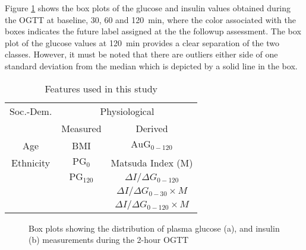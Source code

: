 \documentclass[a4paper,twoside]{article}
\begin{document}
Figure \ref{fig:ogtt_mean} shows the box plots of the glucose and insulin values obtained during the OGTT at baseline, 30, 60 and \SI{120}{\minute}, where the color associated with the boxes indicates the future label assigned at the the followup assessment. The box plot of the glucose values at \SI{120}{\minute} provides a clear separation of the two classes. However, it must be noted that there are outliers either side of one standard deviation from the median which is depicted by a solid line in the box.
%
% 
\begin{table}[!htbp]
\centering
\begin{tabular}{c c c}
\toprule
{Soc.-Dem.} & \multicolumn{2}{c}{Physiological}{} \\
\cmidrule{2-3}
& Measured & Derived \\
\midrule \midrule
Age & BMI & $\textrm{AuG}_{0-120}$ \\
Ethnicity & $\textrm{PG}_0$ & Matsuda Index (M)  \\
& $\textrm{PG}_{120}$ & \( {\Delta I}/{\Delta G}_{0-120} \)\\
& & \( {\Delta I}/{\Delta G}_{0-30} \times M \) \\
& & \( {\Delta I}/{\Delta G}_{0-120} \times M \) \\
\bottomrule
\end{tabular}
\caption{Features used in this study}
\label{tab:features}
\end{table}
% 
% 
\begin{figure}[!h]
  \centering
  \hfil
      \caption{Box plots showing the distribution of plasma glucose (a), and insulin (b) measurements during the 2-hour OGTT}
    \label{fig:ogtt_mean}
\end{figure}
% 
\end{document}
